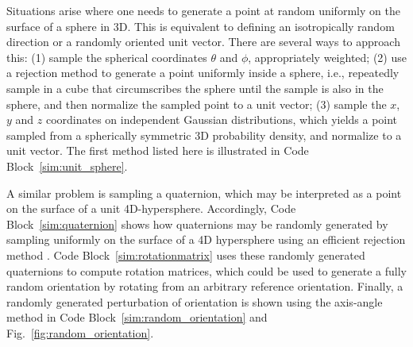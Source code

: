 Situations arise where one needs to generate a point at random uniformly on the surface of a sphere in 3D.  This is equivalent to defining an isotropically random direction or a randomly oriented unit vector. There are several ways to approach this: (1) sample the spherical coordinates $\theta$ and $\phi$, appropriately weighted; (2) use a rejection method to generate a point uniformly inside a sphere, i.e., repeatedly sample in a cube that circumscribes the sphere until the sample is also in the sphere, and then normalize the sampled point to a unit vector; (3) sample the $x$, $y$ and $z$ coordinates on independent Gaussian distributions, which yields a point sampled from a spherically symmetric 3D probability density, and normalize to a unit vector. The first method listed here is illustrated in Code Block~\ref{sim:unit_sphere}.

A similar problem is sampling a quaternion, which may be interpreted as a point on the surface of a unit 4D-hypersphere.
Accordingly, Code Block~\ref{sim:quaternion} shows how quaternions may be randomly generated by sampling uniformly on the surface of a 4D hypersphere using an efficient rejection method \cite{vesely_angular_1982}.
Code Block~\ref{sim:rotationmatrix} uses these randomly generated quaternions to compute rotation matrices, which could be used to generate a fully random orientation by rotating from an arbitrary reference orientation.
Finally, a randomly generated perturbation of orientation is shown using the axis-angle method in Code Block~\ref{sim:random_orientation} and Fig.~\ref{fig:random_orientation}.

\begin{figure}

\end{figure}

